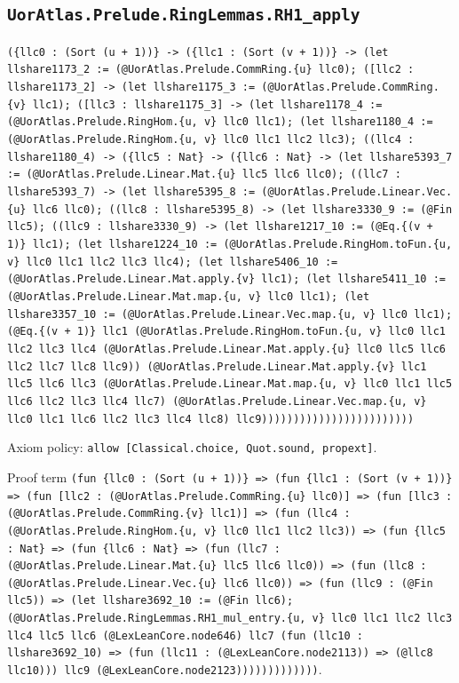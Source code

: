 \documentclass[11pt]{article}
\begin{document}
\subsection*{\texttt{UorAtlas.Prelude.RingLemmas.RH1\_apply}}
\noindent\texttt{(\{llc0 : (Sort (u + 1))\} -> (\{llc1 : (Sort (v + 1))\} -> (let llshare1173\_2 := (@UorAtlas.Prelude.CommRing.\{u\} llc0); ([llc2 : llshare1173\_2] -> (let llshare1175\_3 := (@UorAtlas.Prelude.CommRing.\{v\} llc1); ([llc3 : llshare1175\_3] -> (let llshare1178\_4 := (@UorAtlas.Prelude.RingHom.\{u, v\} llc0 llc1); (let llshare1180\_4 := (@UorAtlas.Prelude.RingHom.\{u, v\} llc0 llc1 llc2 llc3); ((llc4 : llshare1180\_4) -> (\{llc5 : Nat\} -> (\{llc6 : Nat\} -> (let llshare5393\_7 := (@UorAtlas.Prelude.Linear.Mat.\{u\} llc5 llc6 llc0); ((llc7 : llshare5393\_7) -> (let llshare5395\_8 := (@UorAtlas.Prelude.Linear.Vec.\{u\} llc6 llc0); ((llc8 : llshare5395\_8) -> (let llshare3330\_9 := (@Fin llc5); ((llc9 : llshare3330\_9) -> (let llshare1217\_10 := (@Eq.\{(v + 1)\} llc1); (let llshare1224\_10 := (@UorAtlas.Prelude.RingHom.toFun.\{u, v\} llc0 llc1 llc2 llc3 llc4); (let llshare5406\_10 := (@UorAtlas.Prelude.Linear.Mat.apply.\{v\} llc1); (let llshare5411\_10 := (@UorAtlas.Prelude.Linear.Mat.map.\{u, v\} llc0 llc1); (let llshare3357\_10 := (@UorAtlas.Prelude.Linear.Vec.map.\{u, v\} llc0 llc1); (@Eq.\{(v + 1)\} llc1 (@UorAtlas.Prelude.RingHom.toFun.\{u, v\} llc0 llc1 llc2 llc3 llc4 (@UorAtlas.Prelude.Linear.Mat.apply.\{u\} llc0 llc5 llc6 llc2 llc7 llc8 llc9)) (@UorAtlas.Prelude.Linear.Mat.apply.\{v\} llc1 llc5 llc6 llc3 (@UorAtlas.Prelude.Linear.Mat.map.\{u, v\} llc0 llc1 llc5 llc6 llc2 llc3 llc4 llc7) (@UorAtlas.Prelude.Linear.Vec.map.\{u, v\} llc0 llc1 llc6 llc2 llc3 llc4 llc8) llc9))))))))))))))))))))))))}\par
\noindent Axiom policy: \texttt{allow [Classical.choice, Quot.sound, propext]}.\par
\noindent Proof term \texttt{(fun \{llc0 : (Sort (u + 1))\} => (fun \{llc1 : (Sort (v + 1))\} => (fun [llc2 : (@UorAtlas.Prelude.CommRing.\{u\} llc0)] => (fun [llc3 : (@UorAtlas.Prelude.CommRing.\{v\} llc1)] => (fun (llc4 : (@UorAtlas.Prelude.RingHom.\{u, v\} llc0 llc1 llc2 llc3)) => (fun \{llc5 : Nat\} => (fun \{llc6 : Nat\} => (fun (llc7 : (@UorAtlas.Prelude.Linear.Mat.\{u\} llc5 llc6 llc0)) => (fun (llc8 : (@UorAtlas.Prelude.Linear.Vec.\{u\} llc6 llc0)) => (fun (llc9 : (@Fin llc5)) => (let llshare3692\_10 := (@Fin llc6); (@UorAtlas.Prelude.RingLemmas.RH1\_mul\_entry.\{u, v\} llc0 llc1 llc2 llc3 llc4 llc5 llc6 (@LexLeanCore.node646) llc7 (fun (llc10 : llshare3692\_10) => (fun (llc11 : (@LexLeanCore.node2113)) => (@llc8 llc10))) llc9 (@LexLeanCore.node2123)))))))))))))}.\par
\end{document}
